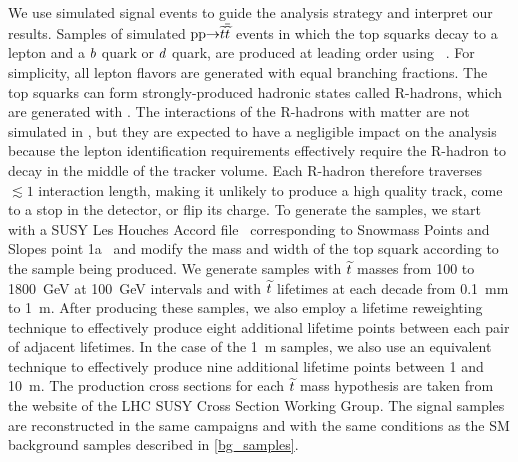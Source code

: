 We use simulated signal events to guide the analysis strategy and interpret our results. Samples of simulated $\mathrm{p}\mathrm{p} {\to} \widetilde{t} \overline{\widetilde{t}}$ events in which the top squarks decay to a lepton and a $b$ quark or $d$ quark, are produced at leading order using ~\cite{PYTHIA8}. For simplicity, all lepton flavors are generated with equal branching fractions. The top squarks can form strongly-produced hadronic states called R-hadrons, which are generated with \PYTHIA. The interactions of the R-hadrons with matter are not simulated in \GEANTfour, but they are expected to have a negligible impact on the analysis because the lepton identification requirements effectively require the R-hadron to decay in the middle of the tracker volume. Each R-hadron therefore traverses $\lesssim1$ interaction length, making it unlikely to produce a high quality track, come to a stop in the detector, or flip its charge. To generate the samples, we start with a SUSY Les Houches Accord file~\cite{LesHouches} corresponding to Snowmass Points and Slopes point 1a~\cite{snowmass_points_slopes} and modify the mass and width of the top squark according to the sample being produced. We generate samples with $\widetilde{t}$ masses from \num{100} to \SI{1800}{\GeV} at \SI{100}{\GeV} intervals and with $\widetilde{t}$ lifetimes at each decade from \SI{0.1}{\mm} to \SI{1}{m}. After producing these samples, we also employ a lifetime reweighting technique to effectively produce eight additional lifetime points between each pair of adjacent lifetimes. In the case of the 1~m samples, we also use an equivalent technique to effectively produce nine additional lifetime points between \num{1} and \SI{10}{\m}. The production cross sections for each $\widetilde{t}$ mass hypothesis are taken from the website of the LHC SUSY Cross Section Working Group. The signal samples are reconstructed in the same campaigns and with the same conditions as the SM background samples described in \ref{bg_samples}.


\pagebreak